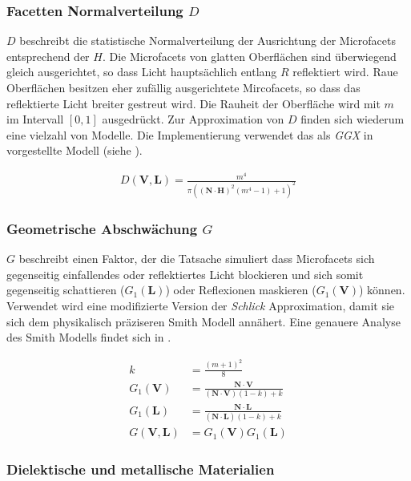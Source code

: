 \subsubsection[Facetten Normalverteilung]{Facetten Normalverteilung $D$} 
$D$ beschreibt die statistische Normalverteilung der Ausrichtung der Microfacets entsprechend der  $H$. Die Microfacets von glatten Oberflächen sind überwiegend gleich ausgerichtet, so dass Licht hauptsächlich entlang $R$ reflektiert wird. Raue Oberflächen besitzen eher zufällig ausgerichtete Mircofacets, so dass das reflektierte Licht breiter gestreut wird. Die Rauheit der Oberfläche wird mit $m$ im Intervall $[0,1]$ ausgedrückt. Zur Approximation von $D$ finden sich wiederum eine vielzahl von Modelle. Die Implementierung verwendet das als \textit{GGX} in \cite{Walter2007} vorgestellte Modell (siehe ).

\begin{align}
	\label{eq:ggx}
	D(\mathbf V,\mathbf L) = \frac{m^4}{ \pi \left(\left( \mathbf N \cdot \mathbf H \right)^2\left(m^4 - 1\right) + 1\right)^2}
\end{align}


\subsubsection[Geometrische Abschwächung]{Geometrische Abschwächung $G$} 
$G$ beschreibt einen Faktor, der die Tatsache simuliert dass Microfacets sich gegenseitig einfallendes oder reflektiertes Licht blockieren und sich somit gegenseitig schattieren ($G_1(\mathbf L)$) oder Reflexionen maskieren ($G_1(\mathbf V)$) können. Verwendet wird eine modifizierte Version der \textit{Schlick} Approximation, damit sie sich dem physikalisch präziseren Smith Modell annähert. Eine genauere Analyse des Smith Modells findet sich in \cite[Kapitel 6, Seite 33]{Heitz2014}.

\begin{align}
	\label{eq:geometric-schlick}
	k &= \frac{(m + 1)^2}{8}\\
	G_1(\mathbf V) &= \frac{\mathbf N \cdot \mathbf V}{(\mathbf N \cdot \mathbf V)(1-k)+k}\\
	G_1(\mathbf L) &= \frac{\mathbf N \cdot \mathbf L}{(\mathbf N \cdot \mathbf L)(1-k)+k}\\
	G(\mathbf V,\mathbf L) &= G_1(\mathbf V) G_1(\mathbf L)
\end{align}


\subsubsection{Dielektische und metallische Materialien}

